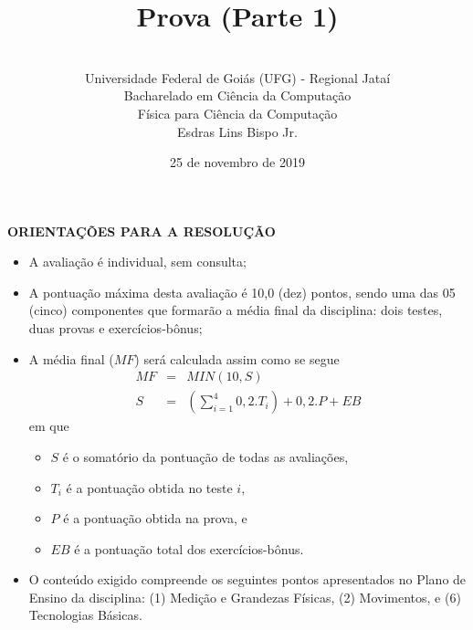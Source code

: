 \documentclass[12pt,a4paper,oneside]{article}
\author{\\Universidade Federal de Goiás (UFG) - Regional Jataí\\Bacharelado em Ciência da Computação \\Física para Ciência da Computação \\Esdras Lins Bispo Jr.}
\title{\sc \huge Prova (Parte 1)}
\date{25 de novembro de 2019}
\begin{document}
\maketitle

{\bf ORIENTAÇÕES PARA A RESOLUÇÃO}

\footnotesize

\begin{itemize}
	\item A avaliação é individual, sem consulta;
	\item A pontuação máxima desta avaliação é 10,0 (dez) pontos, sendo uma das 05 (cinco) componentes que formarão a média final da disciplina: dois testes, duas provas e exercícios-bônus;
	\item A média final ($MF$) será calculada assim como se segue
	\begin{eqnarray}
		MF & = & MIN(10, S) \nonumber \\
		S & = & (\sum_{i=1}^{4} 0,2.T_i ) + 0,2.P  + EB \nonumber
	\end{eqnarray}
	em que 
	\begin{itemize}
		\item $S$ é o somatório da pontuação de todas as avaliações,
		\item $T_i$ é a pontuação obtida no teste $i$,
		\item $P$ é a pontuação obtida na prova, e
		\item $EB$ é a pontuação total dos exercícios-bônus.
	\end{itemize}
	\item O conteúdo exigido compreende os seguintes pontos apresentados no Plano de Ensino da disciplina: (1) Medição e Grandezas Físicas, (2) Movimentos, e (6) Tecnologias Básicas.
\end{itemize}


\begin{center}
\end{center}

\newpage

\normalsize
\end{document}
